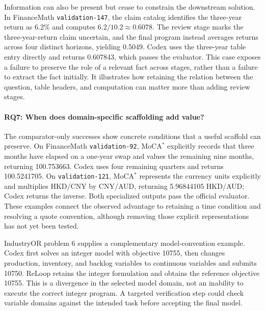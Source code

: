 Information can also be present but cease to constrain the downstream solution. In FinanceMath
\texttt{validation-147}, the claim catalog identifies the three-year return as 6.2\% and computes
$6.2/10.2\approx0.6078$. The review stage marks the three-year-return claim uncertain, and the
final program instead averages returns across four distinct horizons, yielding 0.5049. Codex
uses the three-year table entry directly and returns 0.607843, which passes the evaluator.
This case exposes a failure to preserve the role of a relevant fact across stages, rather than
a failure to extract the fact initially. It illustrates how retaining the relation between
the question, table headers, and computation can matter more than adding review stages.

\paragraph{RQ7: When does domain-specific scaffolding add value?}
The comparator-only successes show concrete conditions that a useful scaffold can preserve.
On FinanceMath \texttt{validation-92}, MoCA$^*$ explicitly records that three months have elapsed
on a one-year swap and values the remaining nine months, returning 100.753663. Codex uses four
remaining quarters and returns 100.5241705. On \texttt{validation-121}, MoCA$^*$ represents the
currency units explicitly and multiplies HKD/CNY by CNY/AUD, returning 5.96844105 HKD/AUD;
Codex returns the inverse. Both specialized outputs pass the official evaluator. These examples
connect the observed advantage to retaining a time condition and resolving a quote convention,
although removing those explicit representations has not yet been tested.

IndustryOR problem 6 supplies a complementary model-convention example. Codex first solves an
integer model with objective 10755, then changes production, inventory, and backlog variables
to continuous variables and submits 10750. ReLoop retains the integer formulation and obtains
the reference objective 10755. This is a divergence in the selected model domain, not an inability
to execute the correct integer program. A targeted verification step could check variable domains
against the intended task before accepting the final model. 

